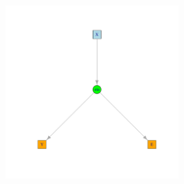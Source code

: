 \documentclass[12pt]{article}
\begin{document}
\begin{center}
\includegraphics[width=0.5\textwidth]{./figures/show-bivariateLVM-Age.pdf}
\end{center}

\vspace{-1cm}
\end{document}
